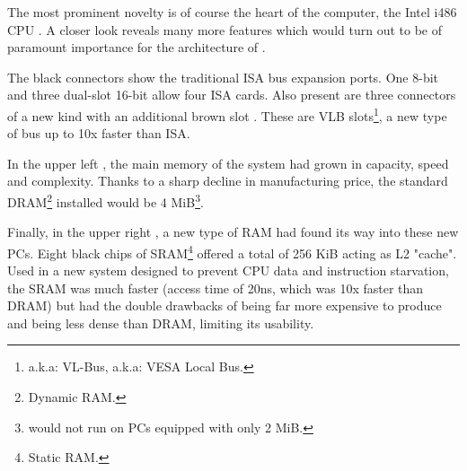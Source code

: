 \par
The most prominent novelty is of course the heart of the computer, the Intel i486 CPU . A closer look reveals many more features which would turn out to be of paramount importance for the architecture of \doom.\\
\par 
The black connectors show the traditional ISA bus expansion ports. One 8-bit  and three dual-slot 16-bit  allow four ISA cards. Also present are three connectors of a new kind with an additional brown slot . These are VLB slots\footnote{a.k.a: VL-Bus, a.k.a: VESA Local Bus.}, a new type of bus up to 10x faster than ISA.

\par
In the upper left , the main memory of the system had grown in capacity, speed and complexity. Thanks to a sharp decline in manufacturing price, the standard DRAM\footnote{Dynamic RAM.} installed would be 4 MiB\footnote{\doom{} would not run on PCs equipped with only 2 MiB.}.\\
\par
 Finally, in the upper right , a new type of RAM had found its way into these new PCs. Eight black chips of SRAM\footnote{Static RAM.} offered a total of 256 KiB acting as L2 "cache". Used in a new system designed to prevent CPU data and instruction starvation, the SRAM was much faster (access time of 20ns, which was 10x faster than DRAM) but had the double drawbacks of being far more expensive to produce and being less dense than DRAM, limiting its usability.




